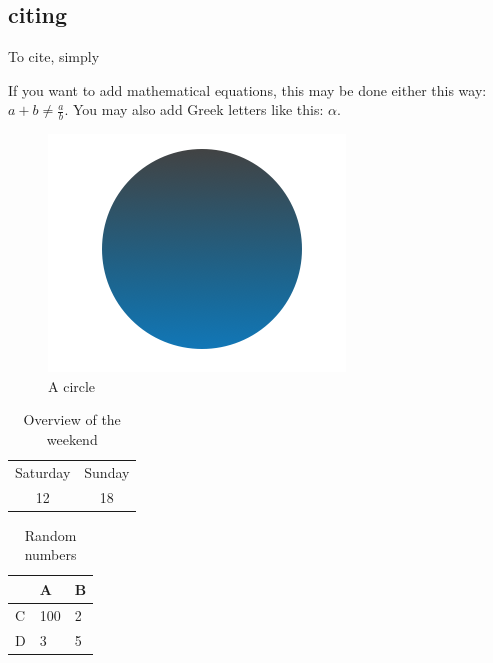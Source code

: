 \subsection{citing}
To cite, simply \cite{homo114514}




If you want to add mathematical equations, this may be done either this way: $a +  b \neq \frac{a}{b}$. You may also add Greek letters like this: $\alpha$.\\ 

\blindtext %

\begin{figure}[htpb!] %
    \centering %
\includegraphics[scale=0.8]{figure/figure.png} %
    \caption{A circle} %
    \label{fig:my_label} %
\end{figure}

\blindtext %

\begin{table}[] %
    \centering
    \begin{tabular}{c|c}
        Saturday & Sunday \\
        12 & 18
    \end{tabular}
    \caption{Overview of the weekend}%
    \label{tab:weekend} %
\end{table}

\begin{table}[] %
    \centering
\begin{tabular}{@{}lll@{}}
\toprule
  & A   & B \\ \midrule
C & 100 & 2 \\
D & 3   & 5 \\ \bottomrule
\end{tabular}
    \caption{Random numbers} %
    \label{tab:numbers} %
\end{table}


